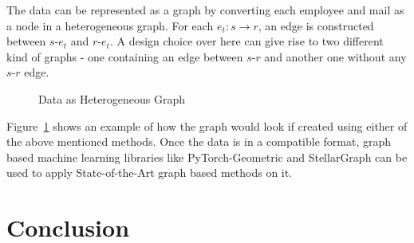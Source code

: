 The data can be represented as a graph by converting each employee and mail as a node in a heterogeneous graph. For each $e_t : s \rightarrow r$, an edge is constructed between $s$-$e_t$ and $r$-$e_t$. A design choice over here can give rise to two different kind of graphs - one containing an edge between $s$-$r$ and another one without any $s$-$r$ edge. 

\clearpage

\begin{figure}[!tbp]
  \centering
{} 
    \caption{Data as Heterogeneous Graph}
  \label{fig:data_as_graph}
\end{figure}


Figure~\ref{fig:data_as_graph} shows an example of how the graph would look if created using either of the above mentioned methods. Once the data is in a compatible format, graph based machine learning libraries like PyTorch-Geometric\cite{Fey/Lenssen/2019} and StellarGraph\cite{StellarGraph} can be used to apply State-of-the-Art graph based methods on it.

\section{Conclusion}

